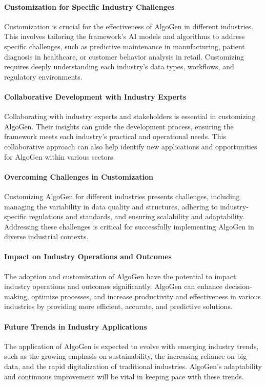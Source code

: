 \documentclass{article}
\begin{document}
\paragraph{Customization for Specific Industry Challenges}
Customization is crucial for the effectiveness of AlgoGen in different industries. This involves tailoring the framework's AI models and algorithms to address specific challenges, such as predictive maintenance in manufacturing, patient diagnosis in healthcare, or customer behavior analysis in retail. Customizing requires deeply understanding each industry's data types, workflows, and regulatory environments.

\paragraph{Collaborative Development with Industry Experts}
Collaborating with industry experts and stakeholders is essential in customizing AlgoGen. Their insights can guide the development process, ensuring the framework meets each industry's practical and operational needs. This collaborative approach can also help identify new applications and opportunities for AlgoGen within various sectors.

\paragraph{Overcoming Challenges in Customization}
Customizing AlgoGen for different industries presents challenges, including managing the variability in data quality and structures, adhering to industry-specific regulations and standards, and ensuring scalability and adaptability. Addressing these challenges is critical for successfully implementing AlgoGen in diverse industrial contexts.

\paragraph{Impact on Industry Operations and Outcomes}
The adoption and customization of AlgoGen have the potential to impact industry operations and outcomes significantly. AlgoGen can enhance decision-making, optimize processes, and increase productivity and effectiveness in various industries by providing more efficient, accurate, and predictive solutions.

\paragraph{Future Trends in Industry Applications}
The application of AlgoGen is expected to evolve with emerging industry trends, such as the growing emphasis on sustainability, the increasing reliance on big data, and the rapid digitalization of traditional industries. AlgoGen's adaptability and continuous improvement will be vital in keeping pace with these trends.
\end{document}
